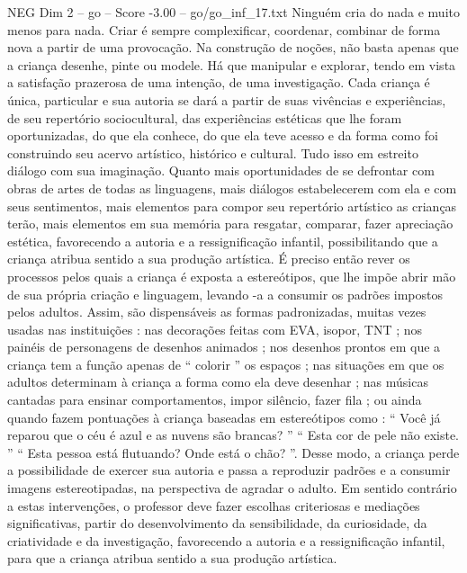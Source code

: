 \begin{textsample}{NEG Dim 2 – go – Score -3.00 – go/go\_inf\_17.txt}
Ninguém cria do nada e muito menos para nada.
Criar é sempre complexificar, coordenar, combinar de forma nova a partir de uma provocação.
Na construção de noções, não basta apenas que a criança desenhe, pinte ou modele.
Há que manipular e explorar, tendo em vista a satisfação prazerosa de uma intenção, de uma investigação.
Cada criança é única, particular e sua autoria se dará a partir de suas vivências e experiências, de seu repertório sociocultural, das experiências estéticas que lhe foram oportunizadas, do que ela conhece, do que ela teve acesso e da forma como foi construindo seu acervo artístico, histórico e cultural.
Tudo isso em estreito diálogo com sua imaginação.
Quanto mais oportunidades de se defrontar com obras de artes de todas as linguagens, mais diálogos estabelecerem com ela e com seus sentimentos, mais elementos para compor seu repertório artístico as crianças terão, mais elementos em sua memória para resgatar, comparar, fazer apreciação estética, favorecendo a autoria e a ressignificação infantil, possibilitando que a criança atribua sentido a sua produção artística.
É preciso então rever os processos pelos quais a criança é exposta a estereótipos, que lhe impõe abrir mão de sua própria criação e linguagem, levando -a a consumir os padrões impostos pelos adultos.
Assim, são dispensáveis as formas padronizadas, muitas vezes usadas nas instituições : nas decorações feitas com EVA, isopor, TNT ; nos painéis de personagens de desenhos animados ; nos desenhos prontos em que a criança tem a função apenas de “ colorir ” os espaços ; nas situações em que os adultos determinam à criança a forma como ela deve desenhar ; nas músicas cantadas para ensinar comportamentos, impor silêncio, fazer fila ; ou ainda quando fazem pontuações à criança baseadas em estereótipos como : “ Você já reparou que o céu é azul e as nuvens são brancas? ” “ Esta cor de pele não existe. ” “ Esta pessoa está flutuando?
Onde está o chão? ”.
Desse modo, a criança perde a possibilidade de exercer sua autoria e passa a reproduzir padrões e a consumir imagens estereotipadas, na perspectiva de agradar o adulto.
Em sentido contrário a estas intervenções, o professor deve fazer escolhas criteriosas e mediações significativas, partir do desenvolvimento da sensibilidade, da curiosidade, da criatividade e da investigação, favorecendo a autoria e a ressignificação infantil, para que a criança atribua sentido a sua produção artística.

\end{textsample}
